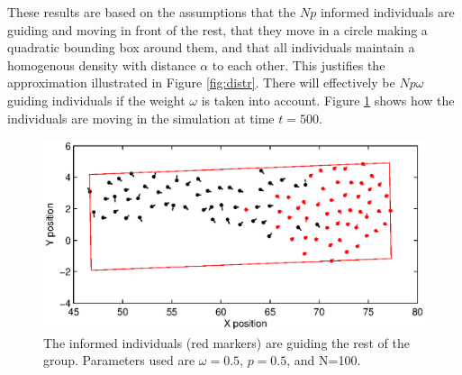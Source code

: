 
These results are based on the assumptions that the $Np$ informed individuals are guiding and moving in front of the rest, that they move in a circle making a quadratic bounding box around them, and that all individuals maintain a homogenous density with distance $\alpha$ to each other. This justifies the approximation illustrated in Figure \ref{fig:distr}. There will effectively be $Np\omega$ guiding individuals if the weight $\omega$ is taken into account. Figure \ref{fig:guiding} shows how the individuals are moving in the simulation at time $t=500$.

\begin{figure}[H]
\begin{center}
\includegraphics[width=\linewidth]{img/guiding.eps}
\caption{The informed individuals (red markers) are guiding the rest of the group. Parameters used are $\omega = 0.5$, $p = 0.5$, and N=100.}
\label{fig:guiding}
\end{center}
\end{figure}


